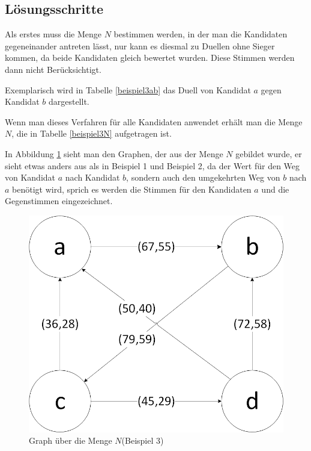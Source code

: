 \subsection{Lösungsschritte} 
\label{sec:loesungen3}
Als erstes muss die Menge $N$ bestimmen werden, in der man die Kandidaten gegeneinander antreten lässt, nur kann es diesmal zu Duellen ohne Sieger kommen, da beide Kandidaten gleich bewertet wurden. Diese Stimmen werden dann nicht Berücksichtigt. 

Exemplarisch wird in Tabelle \ref{beispiel3ab} das Duell von Kandidat $a$ gegen Kandidat $b$ dargestellt. 




Wenn man dieses Verfahren für alle Kandidaten anwendet erhält man die Menge $N$, die in Tabelle \ref{beispiel3N} aufgetragen ist.



In Abbildung \ref{fig:graph3} sieht man den Graphen, der aus der Menge $N$ gebildet wurde, er sieht etwas anders aus als in Beispiel 1 und Beispiel 2, da der Wert für den Weg von Kandidat $a$ nach Kandidat $b$, sondern auch den umgekehrten Weg von $b$ nach $a$ benötigt wird, sprich es werden die Stimmen für den Kandidaten $a$ und die Gegenstimmen eingezeichnet. 

\begin{figure}[!h]
\centering
\includegraphics[scale=0.5]{Bilder/Beispiel3_Graph.png}
\caption{Graph über die Menge $N$(Beispiel 3)}
\label{fig:graph3}
\end{figure}

